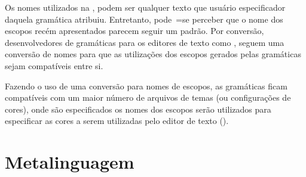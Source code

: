 Os nomes utilizados na ,
podem ser qualquer texto que usuário especificador daquela gramática atribuiu.
Entretanto,
pode~=se perceber que o nome dos escopos recém apresentados parecem seguir um padrão.
Por conversão,
desenvolvedores de gramáticas para os editores de texto como ,
seguem uma conversão de nomes para que as utilizações dos escopos gerados pelas gramáticas sejam compatíveis entre si.

Fazendo o uso de uma conversão para nomes de escopos,
as gramáticas ficam compatíveis com um maior número de arquivos de temas (ou configurações de cores),
onde são especificados os nomes dos escopos serão utilizados para especificar as cores a serem utilizadas pelo editor de texto ().


\section{Metalinguagem}
\label{metalinguagemGrammar}

